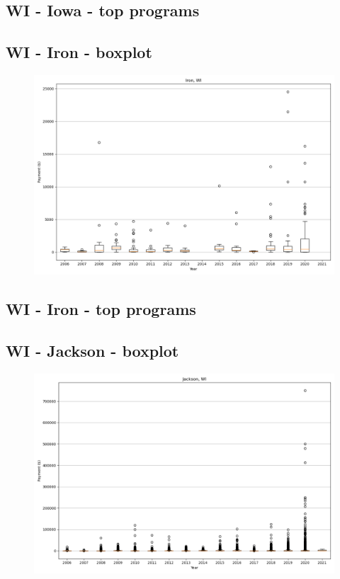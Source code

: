 \subsection*{WI - Iowa - top programs}

\newpage
\subsection*{WI - Iron - boxplot}
\begin{figure}[h]
\centering
\includegraphics[width=7in]{../output/boxplots/counties/Iron-WI_boxplot.png}
\end{figure}


\subsection*{WI - Iron - top programs}

\newpage
\subsection*{WI - Jackson - boxplot}
\begin{figure}[h]
\centering
\includegraphics[width=7in]{../output/boxplots/counties/Jackson-WI_boxplot.png}
\end{figure}


